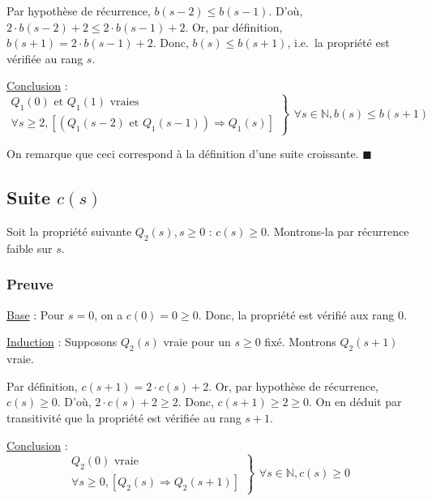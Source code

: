 \documentclass[12pt,a4paper]{article}
\begin{document}
\begin{appendices}
\smallskip
Par hypoth\`ese de r\'ecurrence, $b(s-2) \leq b(s-1)$. D'o\`u, $2\cdot b(s-2)+2 \leq 2\cdot b(s-1)+2$.
Or, par d\'efinition, $b(s+1) = 2\cdot b(s-1) + 2$.
Donc, $b(s) \leq b(s+1)$, i.e.\ la propri\'et\'e est v\'erifi\'ee au rang $s$.

\medskip
\underline{Conclusion} : 
\begin{equation*}
\left .\begin{array}{l}
Q_{1}(0) \text{ et } Q_{1}(1) \text{ vraies } \\
\forall s \geq 2, [(Q_{1}(s-2) \text{ et } Q_{1}(s-1)) \Rightarrow Q_{1}(s) ]
\end{array} \right \}
\left .\begin{array}{l}
\forall s \in \mathbb{N}, b(s) \leq b(s+1)
\end{array}\right .
\end{equation*}

On remarque que ceci correspond \`a la d\'efinition d'une suite croissante. \hfill\ensuremath{\blacksquare}

\subsection*{Suite $c(s)$}
Soit la propri\'et\'e suivante $Q_{2}(s), s \geq 0$ : $c(s) \geq 0$.
Montrons-la par r\'ecurrence faible sur $s$.

\subsubsection*{Preuve}
\underline{Base} : Pour $s = 0$, on a $c(0) = 0 \geq 0$. 
Donc, la propri\'et\'e est v\'erifi\'e aux rang 0.

\medskip
\underline{Induction} : Supposons $Q_{2}(s)$ vraie pour un $s \geq 0$ fix\'e. 
Montrons $Q_{2}(s+1)$ vraie.

\smallskip
Par d\'efinition, $c(s+1) = 2\cdot c(s) + 2$.
Or, par hypoth\`ese de r\'ecurrence, $c(s) \geq 0$. D'o\`u, $2\cdot c(s)+2 \geq 2$.
Donc, $c(s+1) \geq 2 \geq 0$. On en d\'eduit par transitivit\'e que la propri\'et\'e est v\'erifi\'ee au rang $s+1$.

\medskip
\underline{Conclusion} : 
\begin{equation*}
\left .\begin{array}{l}
Q_{2}(0) \text{ vraie } \\
\forall s \geq 0, [Q_{2}(s) \Rightarrow Q_{2}(s+1) ]
\end{array} \right \}
\left .\begin{array}{l}
\forall s \in \mathbb{N}, c(s) \geq 0
\end{array}\right .
\end{equation*}


\end{appendices}
\end{document}

